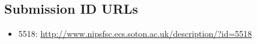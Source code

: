 \documentclass{ecsarticle}     %
\begin{document}
\newpage






\backmatter
\begin{appendix}

\newpage


\section{Submission ID URLs}
\label{sec:id}
\begin{itemize}
	\item 5518: \href{http://nipsfsc.ecs.soton.ac.uk/description/?id=5518}{http://www.nipsfsc.ecs.soton.ac.uk/description/?id=5518}
\end{itemize}





\end{appendix}
\end{document}
